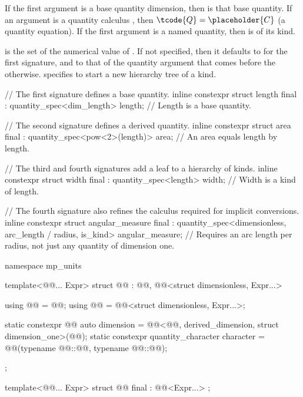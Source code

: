 \pnum
If the first argument is a base quantity dimension,
then  is that base quantity.
If an argument is a quantity calculus ,
then $\tcode{Q} = \placeholder{C}$ (a quantity equation).
If the first argument is a named quantity,
then  is of its kind.

\pnum
{} is the set of the numerical value of .
If not specified, then it defaults to  for the first signature,
and to that of the quantity argument that comes before the  otherwise.
 specifies  to start a new hierarchy tree of a kind.

\pnum
\begin{example}
\begin{codeblock}
// The first signature defines a base quantity.
inline constexpr struct length final : quantity_spec<dim_length> {
} length;  // Length is a base quantity.

// The second signature defines a derived quantity.
inline constexpr struct area final : quantity_spec<pow<2>(length)> {
} area;  // An area equals length by length.

// The third and fourth signatures add a leaf to a hierarchy of kinds.
inline constexpr struct width final : quantity_spec<length> {
} width;  // Width is a kind of length.

// The fourth signature also refines the calculus required for implicit conversions.
inline constexpr struct angular_measure final :
    quantity_spec<dimensionless, arc_length / radius, is_kind> {
} angular_measure;  // Requires an arc length per radius, not just any quantity of dimension one.
\end{codeblock}
\end{example}

\begin{codeblock}
namespace mp_units {

template<@@... Expr>
struct @@ :
    @@,
    @@<struct dimensionless, Expr...> {
  using @@ = @@;
  using @@ = @@<struct dimensionless, Expr...>;

  static constexpr @@ auto dimension =
    @@<@@, derived_dimension, struct dimension_one>(@@{});
  static constexpr quantity_character character =
    @@(typename @@::@@{}, typename @@::@@{});
};

template<@@... Expr>
struct @@ final : @@<Expr...> {};

}
\end{codeblock}

